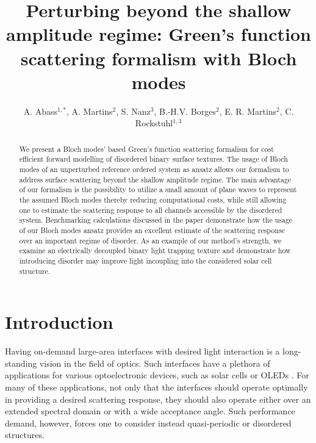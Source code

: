 \documentclass[ floatfix,reprint,amsmath,amssymb,aps,prb]{revtex4-1}
\begin{document}
\title{Perturbing beyond the shallow amplitude regime: Green's function scattering formalism with Bloch modes}

\author{A. Abass$^{1,*}$, A. Martins$^2$, S. Nanz$^3$, B.-H.V. Borges$^2$, E. R. Martins$^2$, C. Rockstuhl$^{1,3}$ }



\begin{abstract}

We present a Bloch modes' based Green's function scattering formalism for cost efficient forward modelling of disordered binary surface textures. The usage of Bloch modes of an unperturbed reference ordered system as ansatz allows our formalism to address surface scattering beyond the shallow amplitude regime.  The main advantage of our formalism is the possibility to utilize a small amount of plane waves to represent the assumed Bloch modes thereby reducing computational costs, while still allowing one to estimate the scattering response to all channels accessible by the disordered system. Benchmarking calculations discussed in the paper demonstrate how the usage of our Bloch modes ansatz provides an excellent estimate of the scattering response over an important regime of disorder. As an example of our method's strength, we examine an electrically decoupled binary light trapping texture and demonstrate how introducing disorder may improve light incoupling into the considered solar cell structure.

\end{abstract}
\maketitle

\section{Introduction}

Having on-demand large-area interfaces with desired light interaction is a long-standing vision in the field of optics. Such interfaces have a plethora of applications for various optoelectronic devices, such as solar cells or OLEDs \cite{Abass2013,Gomard2016,Nanz2018}. For many of these applications, not only that the interfaces should operate optimally in providing a desired scattering response, they should also operate either over an extended spectral domain or  with a wide acceptance angle. Such performance demand, however, forces one to consider instead quasi-periodic or disordered structures\cite{Abass2012,Oskooi2012,Martins2013,Brongersma2014,Piechulla2018}. 
\end{document}
